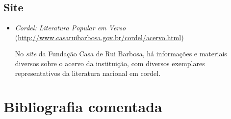 \documentclass[12pt]{extarticle}
\begin{document}
\subsection{Site}

\begin{itemize}
\item\textit{Cordel: Literatura Popular em Verso}\\
(\url{http://www.casaruibarbosa.gov.br/cordel/acervo.html})

No \emph{site} da Fundação Casa de Rui Barbosa, há informações e
materiais diversos sobre o acervo da instituição, com diversos
exemplares representativos da literatura nacional em cordel.
\end{itemize}

\section{Bibliografia comentada}
\end{document}
